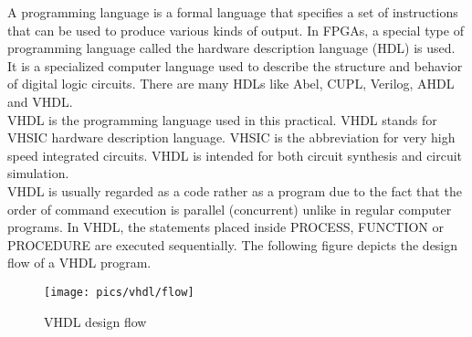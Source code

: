 \noindent
A programming language is a formal language that specifies a set of instructions that can be used to produce various kinds of output. In FPGAs, a special type of programming language called the hardware description language (HDL) is used. It is a specialized computer language used to describe the structure and behavior of  digital logic circuits. There are many HDLs like Abel, CUPL, Verilog, AHDL and VHDL.\\

\noindent
VHDL is the programming language used in this practical. VHDL stands for VHSIC hardware description language. VHSIC is the abbreviation for very high speed integrated circuits. VHDL is intended for both circuit synthesis and circuit simulation. \\

\noindent
VHDL is usually regarded as a code rather as a program due to the fact that the order of command execution is parallel (concurrent) unlike in regular computer programs. In VHDL, the statements placed inside PROCESS, FUNCTION or PROCEDURE are executed sequentially. The following figure depicts the design flow of a VHDL program.

\pagebreak

\begin{figure}[!h]
	\centering
	\texttt{[image: pics/vhdl/flow]}
	\caption{VHDL design flow}
	\label{fig:flow}
\end{figure}

